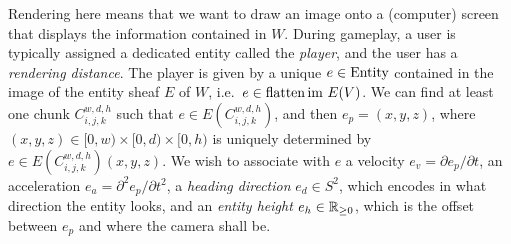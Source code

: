 {%
	\newcommand{\entitylist}[3]{%
		\path (#1) ++(0cm,0.12cm) coordinate (#1-label);
		\begin{scope}[shift={(#1-label)}, scale=1/3, every node/.style={scale=1/3}]
			\fill[white] (-#2cm,-0.1cm) rectangle (#2cm,1.1cm);
			\draw[line width=0.45pt]
			({-#2cm+0.08cm},-0.08cm) -- (-#2cm,-0.08cm) -- (-#2cm,1.08cm) -- ({-#2cm+0.08cm},1.08cm)
			({#2cm-0.08cm},-0.08cm) -- (#2cm,-0.08cm) -- (#2cm,1.08cm) -- ({#2cm-0.08cm},1.08cm);
			#3
		\end{scope}
	}
	\noindent
	\begin{minipage}[t]{0.58\textwidth}
		\vspace{0pt}
		Rendering here means that we want to draw an image onto a (computer) screen
		that displays the information contained in $W$. During gameplay, a user is
		typically assigned a dedicated entity called the \emph{player}, and the user
		has a \emph{rendering distance}. The player is given by a unique
		$e \in \mathrm{Entity}$ contained in the image of the entity sheaf $E$ of $W$, i.e.\
		$e \in \operatorname{flatten} \text{im } E(V)$. We can find at least one chunk
		$C_{i,j,k}^{w,d,h}$ such that $e \in E(C_{i,j,k}^{w,d,h})$, and then $e_p = (x,y,z)$, where
		$(x,y,z) \in [0,w) \times [0,d) \times [0,h)$ is uniquely determined by
		$e \in E(C_{i,j,k}^{w,d,h})(x,y,z)$. We wish to associate
		with $e$ a velocity $e_v = \partial e_p / \partial t$, an acceleration
		$e_a = \partial^2 e_p / \partial t^2$, a \emph{heading
			direction} $e_d \in S^2$, which encodes in what direction the entity looks,
		and an \emph{entity height} $e_h \in \mathbb{R}_{\ge 0}$, which is the offset
		between $e_p$ and where the camera shall be.
	\end{minipage}%
	\hfill
	\begin{minipage}[t]{0.4\textwidth}
		\vspace{0pt}
		\centering
\end{minipage}}
